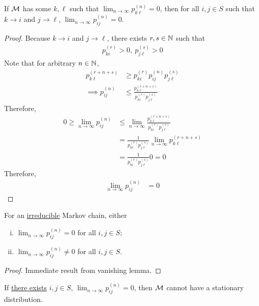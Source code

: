 \documentclass{article}
\newcommand{\upn}[0]{^{(n)}}
\begin{document}
	\begin{lemma}
		If $\mathcal{{M}}$ has some $k, \ell$ such that $\lim_{n \to \infty} p_{k\ell}\upn = 0$, then for all $i, j \in S$
		such that $k \to i$ and $j \to \ell$,
		$\lim_{n \to \infty} p_{ij}\upn = 0$.
	\end{lemma}
	
	\begin{proof}
		Because $k \to i$ and $j \to \ell$, there exists $r, s \in \mathbb{N}$ such that
		\begin{align}
			p_{ki}^{(r)} > 0,\ 
			p_{j\ell}^{(s)} > 0
		\end{align}
		Note that for arbitrary $n \in \mathbb{N}$,
		\begin{align}
			p_{k \ell}^{(r+n+s)}
			&\geq p_{ki}^{(r)} p_{ij}^{(n)} p_{j\ell}^{(s)} \\
			\implies p_{ij}^{(n)}
			&\leq \frac{p_{k \ell}^{(r+n+s)}}{p_{ki}^{(r)}p_{j\ell}^{(s)}}
		\end{align}
		Therefore, 
		\begin{align}
			0 \geq \lim_{n \to \infty} p_{ij}\upn &\leq \lim_{n \to \infty} \frac{p_{k \ell}^{(r+n+s)}}{p_{ki}^{(r)}p_{j\ell}^{(s)}} \\
			&= \frac{1}{{p_{ki}^{(r)}p_{j\ell}^{(s)}}} \lim_{n \to \infty} {p_{k \ell}^{(r+n+s)}} \\
			&= \frac{1}{{p_{ki}^{(r)}p_{j\ell}^{(s)}}} 0 = 0 
		\end{align}
		Therefore,
		\begin{align}
			\lim_{n \to \infty} p_{ij}\upn &= 0
		\end{align}
	\end{proof}
	
	\begin{corollary}
		For an \ul{irreducible} Markov chain, either
		\begin{enumerate}[(i)]
			\item $\lim _{n \rightarrow \infty} p_{i j}^{(n)}=0$ for all $i, j \in S$;
			\item $\lim _{n \rightarrow \infty} p_{i j}^{(n)}\neq 0$ for all $i, j \in S$.
		\end{enumerate}
	\end{corollary}
	
	\begin{proof}
		Immediate result from vanishing lemma.
	\end{proof}
	
	\begin{corollary}
		If \ul{there exists} $i, j \in S$, $\lim_{n \to \infty} p_{ij}\upn = 0$, then $\mathcal{{M}}$ cannot have a stationary distribution.
	\end{corollary}
	
\end{document}
